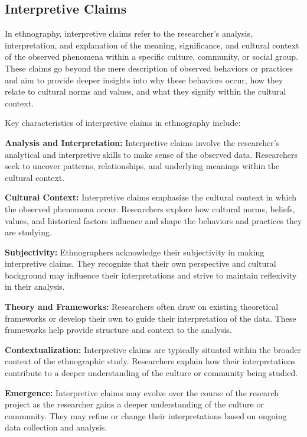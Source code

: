 \documentclass[
  b5paper]{book}
\begin{document}
\hypertarget{interpretive-claims}{%
\subsection*{Interpretive Claims}\label{interpretive-claims}}

In ethnography, interpretive claims refer to the researcher's analysis, interpretation, and explanation of the meaning, significance, and cultural context of the observed phenomena within a specific culture, community, or social group. These claims go beyond the mere description of observed behaviors or practices and aim to provide deeper insights into why these behaviors occur, how they relate to cultural norms and values, and what they signify within the cultural context.

Key characteristics of interpretive claims in ethnography include:

\textbf{Analysis and Interpretation:} Interpretive claims involve the researcher's analytical and interpretive skills to make sense of the observed data. Researchers seek to uncover patterns, relationships, and underlying meanings within the cultural context.

\textbf{Cultural Context:} Interpretive claims emphasize the cultural context in which the observed phenomena occur. Researchers explore how cultural norms, beliefs, values, and historical factors influence and shape the behaviors and practices they are studying.

\textbf{Subjectivity:} Ethnographers acknowledge their subjectivity in making interpretive claims. They recognize that their own perspective and cultural background may influence their interpretations and strive to maintain reflexivity in their analysis.

\textbf{Theory and Frameworks:} Researchers often draw on existing theoretical frameworks or develop their own to guide their interpretation of the data. These frameworks help provide structure and context to the analysis.

\textbf{Contextualization:} Interpretive claims are typically situated within the broader context of the ethnographic study. Researchers explain how their interpretations contribute to a deeper understanding of the culture or community being studied.

\textbf{Emergence:} Interpretive claims may evolve over the course of the research project as the researcher gains a deeper understanding of the culture or community. They may refine or change their interpretations based on ongoing data collection and analysis.
\end{document}
